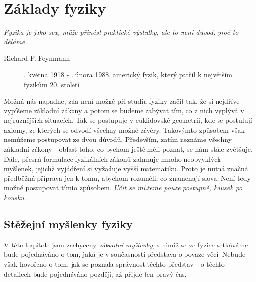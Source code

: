\setchaptertoc
\chapter{Základy fyziky}\label{fyz:IchapI}
  \epigraph{\emph{Fyzika je jako sex, může přinést praktické výsledky, ale to není důvod, proč to 
    děláme.}}{Richard P. Feynmann}

  \begin{figure}[ht!]  %
    \centering
    \caption{\wikiFeynman {}. května 1918 - . února 1988, 
             americký fyzik, který patřil k největším fyzikům 20. století}
    \label{fyz:fig067}
  \end{figure} 

  Možná nás napadne, zda není možné při studiu fyziky začít tak, že si nejdříve vypíšeme základní
  zákony a potom se budeme zabývat tím, co z nich vyplývá v nejrůznějších situacích. Tak se
  postupuje v euklidovské geometrii, kde se postulují axiomy, ze kterých se odvodí všechny možné
  závěry. Takovýmto způsobem však nemůžeme postupovat ze dvou důvodů. Především, zatím neznáme
  všechny základní zákony - oblast toho, co bychom ještě měli poznat, se nám stále zvětšuje. Dále,
  přesná formulace fyzikálních zákonů zahrnuje mnoho neobvyklých myšlenek, jejichž vyjádření si
  vyžaduje vyšší matematiku. Proto je nutná značná předběžná příprava jen k tomu, abychom rozuměli,
  co znamenají slova. Není tedy možné postupovat tímto způsobem. \emph{Učit se můžeme pouze
  postupně, kousek po kousku}.

  \section{Stěžejní myšlenky fyziky}\label{fyz:IchapIsecII}
    V této kapitole jsou zachyceny \emph{základní myšlenky}, s nimiž se ve fyzice setkáváme - 
    bude pojednáváno o tom, jaká je v současnosti představa o povaze věcí. Nebude však hovořeno o 
    tom, jak se poznala správnost těchto představ - o těchto detailech bude pojednáváno později, až 
    přijde ten pravý čas.

